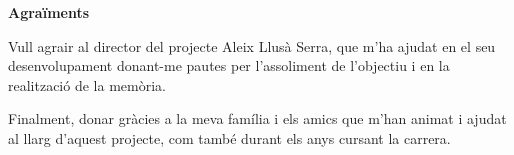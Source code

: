 \centerline{\textbf{Agraïments}}
Vull agrair al director del projecte Aleix Llusà Serra, que m'ha ajudat en el seu desenvolupament
donant-me pautes per l'assoliment de l'objectiu i en la realització de la memòria.

Finalment, donar gràcies a la meva família i els amics que m'han animat i ajudat al llarg
d'aquest projecte, com també durant els anys cursant la carrera.
